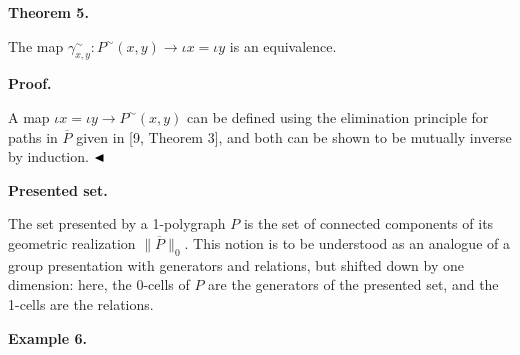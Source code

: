 
 
\par\medskip\noindent\textbf{Theorem 5.}\par
 
 
The map $\gamma^{\sim}_{x,y}:P^{\sim}(x,y)\to\iota x=\iota y$ is an equivalence.\par
 
 
 
 
 
\par\medskip\noindent\textbf{Proof.}\par
 
 
A map $\iota x=\iota y\to P^{\sim}(x,y)$ can be defined using the elimination principle for paths in $\overline{P}$ given in [9, Theorem 3], and both can be shown to be mutually inverse by induction. $\hfill\blacktriangleleft$\par
 
 
 
 
\par\medskip\noindent\textbf{Presented set.}\par
 
 
The set presented by a 1-polygraph $P$ is the set of connected components of its geometric realization $\|\overline{P}\|_{0}$. This notion is to be understood as an analogue of a group presentation with generators and relations, but shifted down by one dimension: here, the 0-cells of $P$ are the generators of the presented set, and the 1-cells are the relations.\par
 
 
 
\par\medskip\noindent\textbf{Example 6.}\par
 
 
